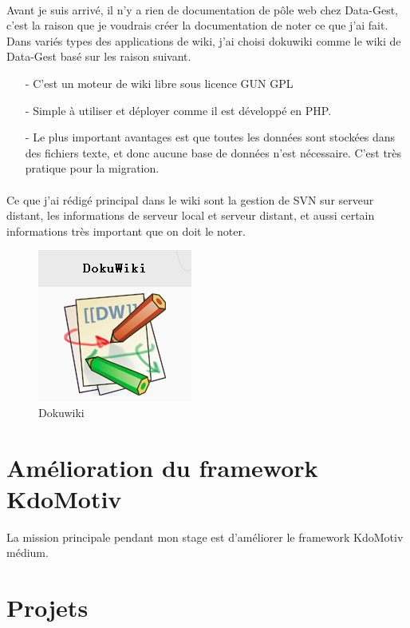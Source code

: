 \paragraph{}
Avant je suis arrivé, il n'y a rien de documentation de pôle web chez Data-Gest, c'est la raison que je voudrais créer la documentation de noter ce que j'ai fait. Dans variés types des applications de wiki, j'ai choisi dokuwiki comme le wiki de Data-Gest basé sur les raison suivant.
\begin{itemize}
\item [-] C'est un moteur de wiki libre sous licence GUN GPL
\item [-] Simple à utiliser et déployer comme il est développé en PHP.
\item [-] Le plus important avantages est que toutes les données sont stockées dans des fichiers texte, et donc aucune base de données n’est nécessaire. C'est très pratique pour la migration.
\end{itemize}

\paragraph{}
Ce que j'ai rédigé principal dans le wiki sont la gestion de SVN sur serveur distant, les informations de serveur local et serveur distant, et aussi certain informations très important que on doit le noter. 

\begin{figure}[hbtp]
\center
\includegraphics[scale=1]{body/images/dukowiki.png}
\caption{Dokuwiki}
\end{figure}

\newpage

\section[Amélioration KdoMotiv]{Amélioration du framework KdoMotiv}
La mission principale pendant mon stage est d'améliorer le framework KdoMotiv médium. 


\newpage
\section{Projets}

